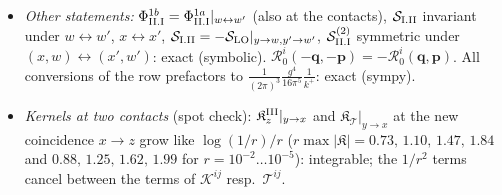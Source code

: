 \documentclass[10pt]{article}
\begin{document}
\begin{itemize}
\item \emph{Other statements:} $\Phi^{1b}_{\rm II.I}=\Phi^{1a}_{\rm II.I}|_{w\leftrightarrow w'}$ (also at the contacts), $\mathcal{S}_{\rm I.II}$ invariant under $w\leftrightarrow w'$, $x\leftrightarrow x'$, $\mathcal{S}_{\rm I.II}=-\mathcal{S}_{\rm LO}|_{y\to w,y'\to w'}$, $\mathcal{S}^{(2)}_{\rm II.I}$ symmetric under $(x,w)\leftrightarrow(x',w')$: exact (symbolic). $\mathcal{R}^{i}_{0}(-\mathbf{q},-\mathbf{p})=-\mathcal{R}^{i}_{0}(\mathbf{q},\mathbf{p})$. All conversions of the row prefactors to $\frac{1}{(2\pi)^{3}}\frac{g^{4}}{16\pi^{5}}\frac{1}{k^{+}}$: exact (sympy).
\item \emph{Kernels at two contacts} (spot check): $\mathfrak{K}^{\rm III}_{z}|_{y\to x}$ and $\mathfrak{K}_{\mathcal{T}}|_{y\to x}$ at the new coincidence $x\to z$ grow like $\log(1/r)/r$ ($r\max|\mathfrak{K}|=0.73,\,1.10,\,1.47,\,1.84$ and $0.88,\,1.25,\,1.62,\,1.99$ for $r=10^{-2}\dots10^{-5}$): integrable; the $1/r^{2}$ terms cancel between the terms of $\mathcal{K}^{ij}$ resp.\ $\mathcal{T}^{ij}$.
\end{itemize}
\end{document}

